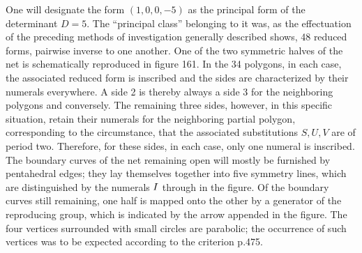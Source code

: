 One will designate the form $(1,0,0,-5)$ as the principal form of the determinant $D=5$. The “principal class” belonging to it was, as the effectuation of the preceding methods of investigation generally described shows, 48 reduced forms, pairwise inverse to one another. One of the two symmetric halves of the net is schematically reproduced in figure 161. In the 34 polygons, in each case, the associated reduced form is inscribed and the sides are characterized by their numerals everywhere. A side 2 is thereby always a side 3 for the neighboring polygons and conversely.  The remaining three sides, however, in this specific situation, retain their numerals for the neighboring partial polygon, corresponding to the circumstance, that the associated substitutions $S, U, V$ are of period two. Therefore, for these sides, in each case, only one numeral is inscribed. The boundary curves of the net remaining open will mostly be furnished by pentahedral edges; they lay themselves together into five symmetry lines, which are distinguished by the numerals $\Rmnum{1}$ through  in the figure. Of the boundary curves still remaining, one half is mapped onto the other by a generator of the reproducing group, which is indicated by the arrow appended in the figure. The four vertices surrounded with small circles are parabolic; the occurrence of such vertices was to be expected according to the criterion p.475.

